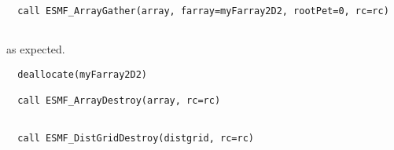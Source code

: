  \begin{verbatim}
  call ESMF_ArrayGather(array, farray=myFarray2D2, rootPet=0, rc=rc)
 
\end{verbatim}
 

   as expected. 

 \begin{verbatim}
  deallocate(myFarray2D2)

  call ESMF_ArrayDestroy(array, rc=rc)
 
\end{verbatim}
 

 \begin{verbatim}
  call ESMF_DistGridDestroy(distgrid, rc=rc)
 
\end{verbatim}

\setlength{\parskip}{\oldparskip}
\setlength{\parindent}{\oldparindent}
\setlength{\baselineskip}{\oldbaselineskip}
